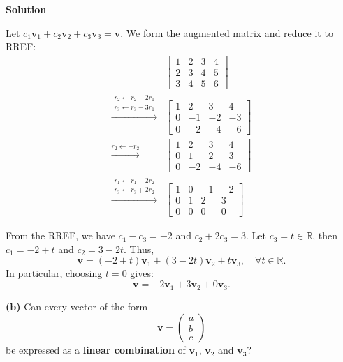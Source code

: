 \documentclass[12pt,a4paper]{article}
\begin{document}
\textbf{Solution}

Let $c_1\mathbf{v}_1 + c_2\mathbf{v}_2 + c_3\mathbf{v}_3 = \mathbf{v}$. We form the augmented matrix and reduce it to RREF:
\begin{align*}
	&\begin{bmatrix}
		1 & 2 & 3 & 4 \\
		2 & 3 & 4 & 5 \\
		3 & 4 & 5 & 6
	\end{bmatrix} \\
	\overset{\substack{r_2 \leftarrow r_2 - 2r_1 \\ r_3 \leftarrow r_3 - 3r_1}}{\longrightarrow} &\begin{bmatrix}
		1 & 2 & 3 & 4 \\
		0 & -1 & -2 & -3 \\
		0 & -2 & -4 & -6
	\end{bmatrix} \\
	\overset{r_2 \leftarrow -r_2}{\longrightarrow} &\begin{bmatrix}
		1 & 2 & 3 & 4 \\
		0 & 1 & 2 & 3 \\
		0 & -2 & -4 & -6
	\end{bmatrix} \\
	\overset{\substack{r_1 \leftarrow r_1 - 2r_2 \\ r_3 \leftarrow r_3 + 2r_2}}{\longrightarrow} &\begin{bmatrix}
		1 & 0 & -1 & -2 \\
		0 & 1 & 2 & 3 \\
		0 & 0 & 0 & 0
	\end{bmatrix}
\end{align*}

From the RREF, we have $c_1 - c_3 = -2$ and $c_2 + 2c_3 = 3$. Let $c_3 = t \in \mathbb{R}$, then $c_1 = -2 + t$ and $c_2 = 3 - 2t$. Thus,
\[
\mathbf{v} = (-2 + t)\mathbf{v}_1 + (3 - 2t)\mathbf{v}_2 + t\mathbf{v}_3, \quad \forall t \in \mathbb{R}.
\]
In particular, choosing $t = 0$ gives:
\[
\mathbf{v} = -2\mathbf{v}_1 + 3\mathbf{v}_2 + 0\mathbf{v}_3.
\]

\par\nopagebreak\vspace{1cm}

\Needspace{8cm}
\textbf{(b)} Can every vector of the form
\[
\mathbf{v}=\begin{pmatrix}a\\b\\c\end{pmatrix}
\]
be expressed as a \textbf{linear combination} of $\mathbf{v}_1$, $\mathbf{v}_2$
and $\mathbf{v}_3$?
\end{document}
